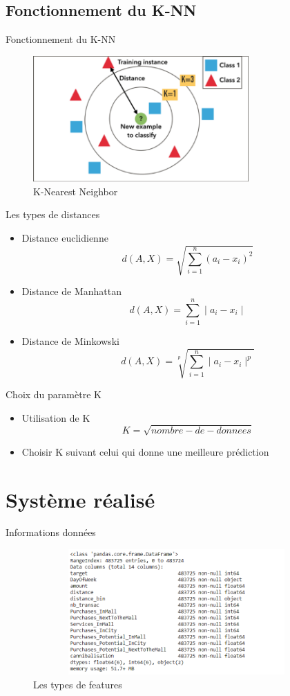 \documentclass[xelatex,12pt]{beamer}
\begin{document}
\subsection{Fonctionnement du K-NN}
\begin{frame}{Fonctionnement du K-NN}
\begin{figure}[H]
    \includegraphics[width=\linewidth, height=4.8cm]{images/knn_sheama.png}
    \caption{K-Nearest Neighbor}
    \label{fig:L1}
\end{figure}
\end{frame}
\begin{frame}{Les types de distances}
\begin{itemize}
		\item Distance euclidienne
		$$d(A,X) = \sqrt{\sum_{i=1}^{n} (a_{i}-x_{i})^{2}}$$
		\item Distance de Manhattan\\
		$$d(A,X) = \sum_{i=1}^{n} \mid{a_{i}-x_{i}}\mid$$
		\item Distance de Minkowski
		$$d(A,X) = \sqrt[p]{\sum_{i=1}^{n} \mid{a_{i}-x_{i}}\mid^{p}}$$
\end{itemize}
\end{frame}
\begin{frame}{Choix du paramètre K}
\begin{itemize}
		\item Utilisation de K
		$$K=\sqrt{nombre-de-donnees }$$
		\item Choisir K suivant celui qui donne une meilleure prédiction
\end{itemize}
\end{frame}

\section{Système réalisé}
\begin{frame}{Informations données}
\begin{figure}[H]
    \includegraphics[width=11cm,height=4.8cm]{images/data_infos.png}
    \caption{ Les types de features}
    \label{fig:L1}
\end{figure}
\end{frame} 
\end{document}
